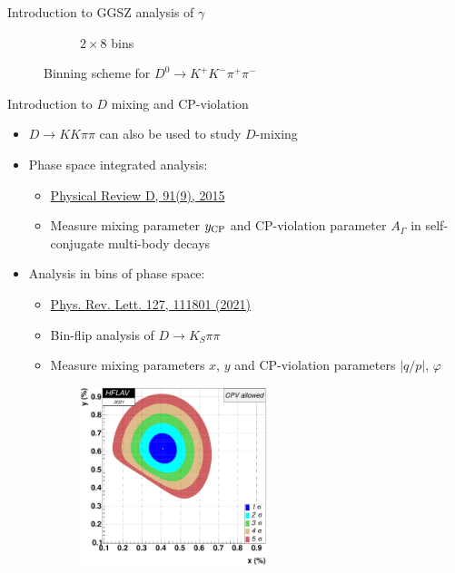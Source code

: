 \documentclass{beamer}
\begin{document}
\begin{frame}{Introduction to GGSZ analysis of $\gamma$}
\begin{figure}
\begin{subfigure}{0.5\textwidth}
      \caption{$2\times 8$ bins}
    \end{subfigure}
    \caption{Binning scheme for $D^0\to K^+K^-\pi^+\pi^-$}
  \end{figure}
\end{frame}

\begin{frame}{Introduction to $D$ mixing and CP-violation}
  \begin{itemize}
    \setlength\itemsep{0.0em}
    \item{$D\to KK\pi\pi$ can also be used to study $D$-mixing}
    \item{Phase space integrated analysis:}
    \begin{itemize}
      \item{\href{https://arxiv.org/abs/1502.04560}{Physical Review D, 91(9), 2015}}
      \item{Measure mixing parameter $y_{\rm CP}$ and CP-violation parameter $A_\Gamma$ in self-conjugate multi-body decays}
    \end{itemize}
    \item{Analysis in bins of phase space:}
    \begin{itemize}
      \item{\href{https://arxiv.org/abs/2106.03744}{Phys. Rev. Lett. 127, 111801 (2021)}}
      \item{Bin-flip analysis of $D\to K_S\pi\pi$}
      \item{Measure mixing parameters $x$, $y$ and CP-violation parameters $|q/p|$, $\varphi$}
    \end{itemize}
  \end{itemize}
  \begin{figure}
    \centering
    \begin{subfigure}{0.4\textwidth}
      \centering
      \includegraphics[width=0.6\textwidth]{Plots/fig_plot_xy2d.pdf}

\end{subfigure}
\end{figure}
\end{frame}
\end{document}
